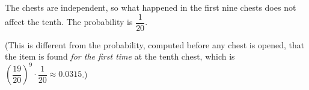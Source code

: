The chests are independent, so what happened in the first nine chests does not affect the tenth. The probability is $\boxed{\dfrac{1}{20}}$.

(This is different from the probability, computed before any chest is opened, that the item is found \emph{for the first time} at the tenth chest, which is $\left(\dfrac{19}{20}\right)^9\cdot\dfrac{1}{20}\approx0.0315$.)
